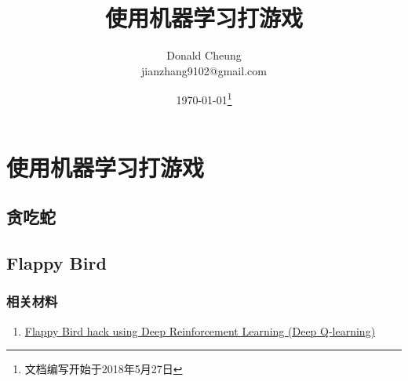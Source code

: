 \ifx\projectsnotes\undefined
    \providecommand{\notesroot}{../..}
    \providecommand{\gamesroot}{.}

    \title{使用机器学习打游戏}
    \author{Donald Cheung\\jianzhang9102@gmail.com}
    \date{\today\footnote{文档编写开始于2018年5月27日}}

    
\else
    \providecommand{\gamesroot}{\projectsroot/games}
\fi

\chapter{使用机器学习打游戏}

\section{贪吃蛇}


\section{Flappy Bird}

\subsection{相关材料}
\begin{enumerate}
    \item \href{https://github.com/yenchenlin/DeepLearningFlappyBird}{Flappy Bird hack using Deep Reinforcement Learning (Deep Q-learning)}
\end{enumerate}


\ifx\projectsnotes\undefined
    
\fi
